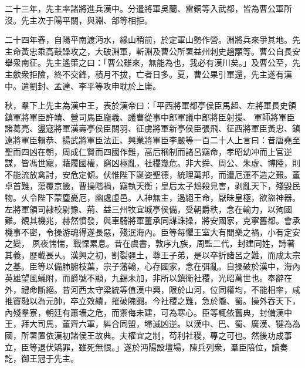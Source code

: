 \begin{pinyinscope}
 
 
 
 二十三年，先主率諸將進兵漢中。分遣將軍吳蘭、雷銅等入武都，皆為曹公軍所沒。先主次于陽平關，與淵、郃等相拒。
 
 
 
 
 二十四年春，自陽平南渡沔水，緣山稍前，於定軍山勢作營。淵將兵來爭其地。先主命黃忠乘高鼓譟攻之，大破淵軍，斬淵及曹公所署益州刺史趙顒等。曹公自長安舉衆南征。先主遙策之曰：「曹公雖來，無能為也，我必有漢川矣。」及曹公至，先主歛衆拒險，終不交鋒，積月不拔，亡者日多。夏，曹公果引軍還，先主遂有漢中。遣劉封、孟達、李平等攻申耽於上庸。
 
 
秋，羣下上先主為漢中王，表於漢帝曰：「平西將軍都亭侯臣馬超、左將軍長史領鎮軍將軍臣許靖、營司馬臣龐羲、議曹從事中郎軍議中郎將臣射援、
 軍師將軍臣諸葛亮、盪寇將軍漢壽亭侯臣關羽、征虜將軍新亭侯臣張飛、征西將軍臣黃忠、鎮遠將軍臣賴恭、揚武將軍臣法正、興業將軍臣李嚴等一百二十人上言曰：昔唐堯至聖而四凶在朝，周成仁賢而四國作難，高后稱制而諸呂竊命，孝昭幼冲而上官逆謀，皆馮世寵，藉履國權，窮凶極亂，社稷幾危。非大舜、周公、朱虛、博陸，則不能流放禽討，安危定傾。伏惟陛下誕姿聖德，統理萬邦，而遭厄運不造之艱。董卓首難，蕩覆京畿，曹操階禍，竊執天衡；皇后太子鴆殺見害，剥亂天下，殘毀民物。乆令陛下蒙塵憂厄，幽處虛邑。人神無主，遏絕王命，厭昧皇極，欲盜神器。左將軍領司隷校尉豫、荊、益三州牧宜城亭侯備，受朝爵秩，念在輸力，以殉國難。覩其機兆，赫然憤發，與車騎將軍董承同謀誅操，將安國家，克寧舊都。會承機事不密，令操游魂得遂長惡，殘泯海內。臣等每懼王室大有閻樂之禍，小有定安之變，
 夙夜惴惴，戰慄累息。昔在虞書，敦序九族，周監二代，封建同姓，詩著其義，歷載長乆。漢興之初，割裂疆土，尊王子弟，是以卒折諸呂之難，而成太宗之基。臣等以備肺腑枝葉，宗子藩翰，心存國家，念在弭亂。自操破於漢中，海內英雄望風蟻附，而爵號不顯，九錫未加，非所以鎮衞社稷，光昭萬世也。奉辭在外，禮命斷絕。昔河西太守梁統等值漢中興，限於山河，位同權均，不能相率，咸推竇融以為元帥，卒立效績，摧破隗嚻。今社稷之難，急於隴、蜀。操外吞天下，內殘羣寮，朝廷有蕭墻之危，而禦侮未建，可為寒心。臣等輒依舊典，封備漢中王，拜大司馬，董齊六軍，糾合同盟，埽滅凶逆。以漢中、巴、蜀、廣漢、犍為為國，所署置依漢初諸侯王故典。夫權宜之制，苟利社稷，專之可也。然後功成事立，臣等退伏矯罪，雖死無恨。」遂於沔陽設壇場，陳兵列衆，羣臣陪位，讀奏訖，御王冠于先主。
 

\end{pinyinscope}
